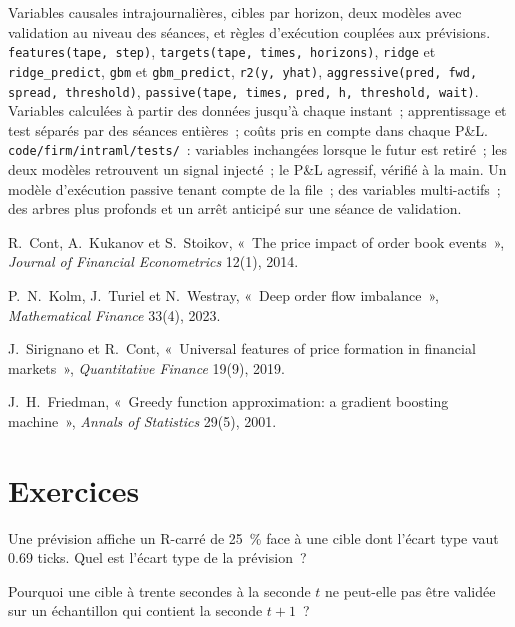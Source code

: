 \begin{build}
 Variables causales intrajournalières, cibles par horizon, deux modèles avec validation au niveau des séances, et règles d'exécution couplées aux prévisions.
 \texttt{features(tape, step)}, \texttt{targets(tape, times, horizons)}, \texttt{ridge} et \texttt{ridge\_predict}, \texttt{gbm} et
\texttt{gbm\_predict}, \texttt{r2(y, yhat)}, \texttt{aggressive(pred, fwd, spread, threshold)}, \texttt{passive(tape, times, pred, h, threshold, wait)}.
 Variables calculées à partir des données jusqu'à chaque instant~; apprentissage et test séparés par des séances entières~; coûts pris en compte dans chaque P\&L.
 \texttt{code/firm/intraml/tests/}~: variables inchangées lorsque le futur est retiré~; les deux modèles retrouvent un signal injecté~; le
P\&L agressif, vérifié à la main.
 Un modèle d'exécution passive tenant compte de la file~; des variables multi-actifs~; des arbres plus profonds et un arrêt anticipé sur une séance de validation.
\end{build}

\begin{omsources}
\item R.~Cont, A.~Kukanov et S.~Stoikov, «~The price impact of order book events~», \emph{Journal of Financial Econometrics} 12(1), 2014.
\item P.~N.~Kolm, J.~Turiel et N.~Westray, «~Deep order flow imbalance~», \emph{Mathematical Finance} 33(4), 2023.
\item J.~Sirignano et R.~Cont, «~Universal features of price formation in financial markets~», \emph{Quantitative Finance} 19(9), 2019.
\item J.~H.~Friedman, «~Greedy function approximation: a gradient boosting machine~», \emph{Annals of Statistics} 29(5), 2001.
\end{omsources}

\section{Exercices}

\begin{exercise}[$\star$]\label{exo:s1:intraday-machine-learned-alphas:1}
Une prévision affiche un R-carré de 25~\% face à une cible dont l'écart type vaut 0.69 ticks. Quel est l'écart type de la prévision~?
\end{exercise}

\begin{exercise}[$\star$]\label{exo:s1:intraday-machine-learned-alphas:2}
Pourquoi une cible à trente secondes à la seconde $t$ ne peut-elle pas être validée sur un échantillon qui contient la seconde $t + 1$~?
\end{exercise}


